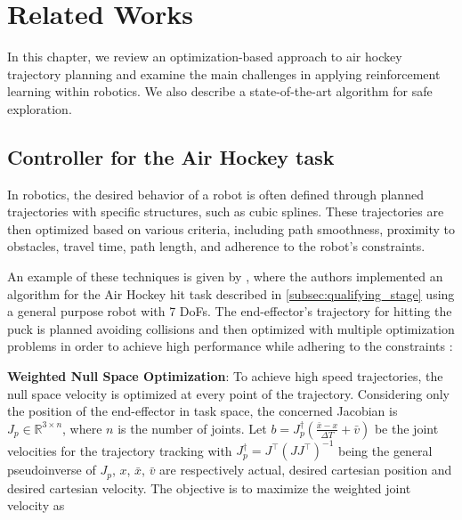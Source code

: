 \chapter{Related Works}
\label{ch:related_works}

In this chapter, we review an optimization-based approach to air hockey trajectory planning and examine the main challenges in applying reinforcement learning within robotics. We also describe a state-of-the-art algorithm for safe exploration.


\section{Controller for the Air Hockey task}
\label{sec:baseline}

In robotics, the desired behavior of a robot is often defined through planned trajectories with specific structures, such as cubic splines. 
These trajectories are then optimized based on various criteria, including path smoothness, proximity to obstacles, travel time, path length, 
and adherence to the robot's constraints.

An example of these techniques is given by \cite{baseline}, where the authors implemented an algorithm for the Air Hockey hit task described in \ref{subsec:qualifying_stage} using a general purpose robot with 7 DoFs.
The end-effector's trajectory for hitting the puck is planned avoiding collisions and then optimized with multiple optimization problems in order to achieve high
performance while adhering to the constraints :

\textbf{Weighted Null Space Optimization}:
To achieve high speed trajectories, the null space velocity is optimized at every point of the trajectory. Considering only the position of the end-effector in task space,
the concerned Jacobian is $J_p \in \mathbb{R}^{3\times n}$, where $n$ is the number of joints. Let $b = J^\dag_p\left(\frac{\bar{x} - x}{\Delta T} + \bar{v}\right)$
be the joint velocities for the trajectory tracking with $J_p^\dag = J^\intercal\left(J J^\intercal\right)^{-1}$ being the general pseudoinverse of $J_p$, $x$, $\bar{x}$, $\bar{v}$ are respectively actual, desired cartesian position and desired cartesian velocity.
The objective is to maximize the weighted joint velocity as

